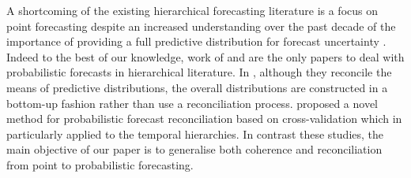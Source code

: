 \documentclass[12pt]{article}
\theoremstyle{definition}
\begin{document}
%

A shortcoming of the existing hierarchical forecasting literature is a focus on point forecasting despite an increased understanding over the past decade of the importance of providing a full predictive distribution for forecast uncertainty \citep[see][and references therein]{Gneiting2014}. Indeed to the best of our knowledge, work of \citet{BenTaieb2017} and \citet{JeoEtAl2019} are the only papers to deal with probabilistic forecasts in hierarchical literature. In \citet{BenTaieb2017}, although they reconcile the means of predictive distributions, the overall distributions are constructed in a bottom-up fashion rather than use a reconciliation process. \citet{JeoEtAl2019} proposed a novel method for probabilistic forecast reconciliation based on cross-validation which in particularly applied to the temporal hierarchies. In contrast these studies, the main objective of our paper is to generalise both coherence and reconciliation from point to probabilistic forecasting.

\end{document}

